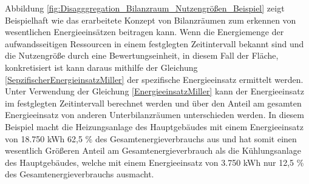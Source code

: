 Abbildung \eqref{fig:Disagggregation_Bilanzraum_Nutzengrößen_Beispiel} zeigt Beispielhaft wie das erarbeitete Konzept von Bilanzräumen zum erkennen von 
wesentlichen Energieeinsätzen beitragen kann. 
Wenn die Energiemenge der aufwandsseitigen Ressourcen in einem festglegten Zeitintervall bekannt sind und die Nutzengröße durch eine 
Bewertungseinheit, in diesem Fall der Fläche, konkretisiert ist kann daraus mithilfe der Gleichung \eqref{SepzifischerEnergieinsatzMiller} der spezifische 
Energieeinsatz ermittelt werden. 
Unter Verwendung der Gleichung \eqref{EnergieeinsatzMiller} kann der Energieeinsatz im festglegten Zeitintervall berechnet werden und über den Anteil am 
gesamten Energieeinsatz von anderen Unterbilanzräumen unterschieden werden.
In diesem Beispiel macht die Heizungsanlage des Hauptgebäudes mit einem Energieeinsatz von 18.750 kWh 62,5 \% des Gesamtenergieverbrauchs aus und hat somit einen 
wesentlich Größeren Anteil am Gesamtenergieverbrauch als die Kühlungsanlage des Hauptgebäudes, welche mit einem Energieeinsatz von 3.750 kWh nur 12,5 \% des 
Gesamtenergieverbrauchs ausmacht.


